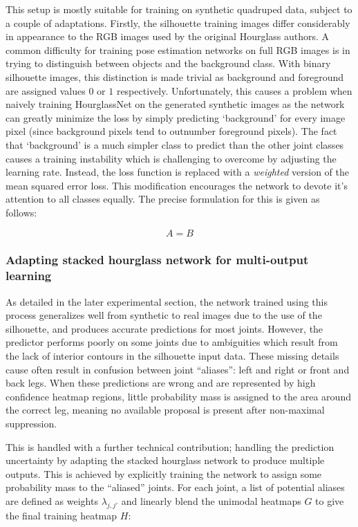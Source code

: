 This setup is mostly suitable for training on synthetic quadruped data, subject to a couple of adaptations. Firstly, the silhouette training images differ considerably in appearance to the RGB images used by the original Hourglass authors. A common difficulty for training pose estimation networks on full RGB images is in trying to distinguish between objects and the background class. With binary silhouette images, this distinction is made trivial as background and foreground are assigned values $0$ or $1$ respectively. Unfortunately, this causes a problem when naively training HourglassNet on the generated synthetic images as the network can greatly minimize the loss by simply predicting `background' for every image pixel (since background pixels tend to outnumber foreground pixels). The fact that `background' is a much simpler class to predict than the other joint classes causes a training instability which is challenging to overcome by adjusting the learning rate. Instead, the loss function is replaced with a \emph{weighted} version of the mean squared error loss. This modification encourages the network to devote it's attention to all classes equally. The precise formulation for this is given as follows:

\begin{equation}\label{eq:weighted-mse}
    A = B
\end{equation}


\subsubsection{Adapting stacked hourglass network for multi-output learning}

As detailed in the later experimental section, the network trained using this process generalizes well from synthetic to real images due to the use of the silhouette, and produces accurate predictions for most joints. However, the predictor performs poorly on some joints due to ambiguities which result from the lack of interior contours in the silhouette input data. These missing details cause often result in confusion between joint ``aliases'': left and right or front and back legs.  When these predictions are wrong and are represented by high confidence heatmap regions, little probability mass is assigned to the area around the correct leg, meaning no available proposal is present after non-maximal suppression.

This is handled with a further technical contribution; handling the prediction uncertainty by adapting the stacked hourglass network to produce multiple outputs. This is achieved by explicitly training the network to assign some probability mass to the ``aliased'' joints. For each joint, a list of potential aliases are defined as weights $\lambda_{j,j'}$ and linearly blend the unimodal heatmaps $G$ to give the final training heatmap $H$:

